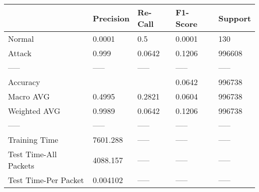 \begin{tabular}{lllll}
\toprule
{} & Precision & Re-Call & F1-Score & Support \\
\midrule
Normal                &    0.0001 &     0.5 &   0.0001 &     130 \\
Attack                &     0.999 &  0.0642 &   0.1206 &  996608 \\
-----                 &     ----- &   ----- &    ----- &   ----- \\
Accuracy              &           &         &   0.0642 &  996738 \\
Macro AVG             &    0.4995 &  0.2821 &   0.0604 &  996738 \\
Weighted AVG          &    0.9989 &  0.0642 &   0.1206 &  996738 \\
-----                 &     ----- &   ----- &    ----- &   ----- \\
Training Time         &  7601.288 &   ----- &    ----- &   ----- \\
Test Time-All Packets &  4088.157 &   ----- &    ----- &   ----- \\
Test Time-Per Packet  &  0.004102 &   ----- &    ----- &   ----- \\
\bottomrule
\end{tabular}
